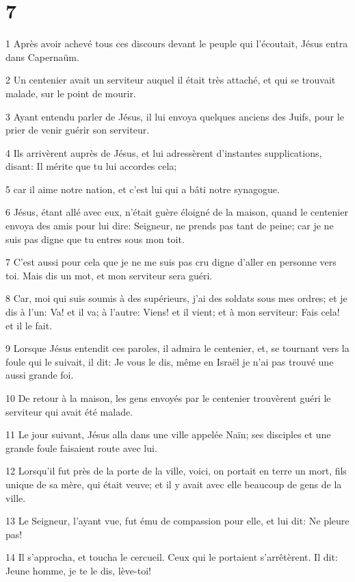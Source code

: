 \chapter{7}

\par 1 Après avoir achevé tous ces discours devant le peuple qui l'écoutait, Jésus entra dans Capernaüm.
\par 2 Un centenier avait un serviteur auquel il était très attaché, et qui se trouvait malade, sur le point de mourir.
\par 3 Ayant entendu parler de Jésus, il lui envoya quelques anciens des Juifs, pour le prier de venir guérir son serviteur.
\par 4 Ils arrivèrent auprès de Jésus, et lui adressèrent d'instantes supplications, disant: Il mérite que tu lui accordes cela;
\par 5 car il aime notre nation, et c'est lui qui a bâti notre synagogue.
\par 6 Jésus, étant allé avec eux, n'était guère éloigné de la maison, quand le centenier envoya des amis pour lui dire: Seigneur, ne prends pas tant de peine; car je ne suis pas digne que tu entres sous mon toit.
\par 7 C'est aussi pour cela que je ne me suis pas cru digne d'aller en personne vers toi. Mais dis un mot, et mon serviteur sera guéri.
\par 8 Car, moi qui suis soumis à des supérieurs, j'ai des soldats sous mes ordres; et je dis à l'un: Va! et il va; à l'autre: Viens! et il vient; et à mon serviteur: Fais cela! et il le fait.
\par 9 Lorsque Jésus entendit ces paroles, il admira le centenier, et, se tournant vers la foule qui le suivait, il dit: Je vous le dis, même en Israël je n'ai pas trouvé une aussi grande foi.
\par 10 De retour à la maison, les gens envoyés par le centenier trouvèrent guéri le serviteur qui avait été malade.
\par 11 Le jour suivant, Jésus alla dans une ville appelée Naïn; ses disciples et une grande foule faisaient route avec lui.
\par 12 Lorsqu'il fut près de la porte de la ville, voici, on portait en terre un mort, fils unique de sa mère, qui était veuve; et il y avait avec elle beaucoup de gens de la ville.
\par 13 Le Seigneur, l'ayant vue, fut ému de compassion pour elle, et lui dit: Ne pleure pas!
\par 14 Il s'approcha, et toucha le cercueil. Ceux qui le portaient s'arrêtèrent. Il dit: Jeune homme, je te le dis, lève-toi!
